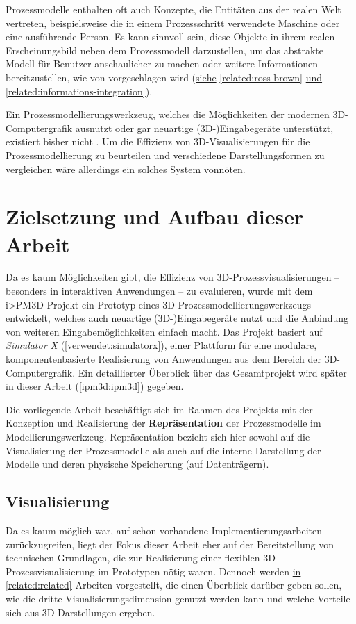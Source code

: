 \documentclass[a4paper,10pt]{sphinxmanual}
\begin{document}
Prozessmodelle enthalten oft auch Konzepte, die Entitäten aus der realen Welt vertreten, beispielsweise die in einem Prozessschritt verwendete Maschine oder eine ausführende Person.
Es kann sinnvoll sein, diese Objekte in ihrem realen Erscheinungsbild neben dem Prozessmodell darzustellen, um das abstrakte Modell für Benutzer anschaulicher zu machen oder weitere Informationen bereitzustellen, wie von \cite{brown_conceptual_2010} vorgeschlagen wird ({\hyperref[related:ross-brown]{siehe}} \autoref*{related:ross-brown} {\hyperref[related:informations-integration]{und}} \autoref*{related:informations-integration}).

Ein Prozessmodellierungswerkzeug, welches die Möglichkeiten der modernen 3D-Computergrafik ausnutzt oder gar neuartige (3D-)Eingabegeräte unterstützt, existiert bisher nicht \cite{brown_conceptual_2010}.
Um die Effizienz von 3D-Visualisierungen für die Prozessmodellierung zu beurteilen und verschiedene Darstellungsformen zu vergleichen wäre allerdings ein solches System vonnöten.


\section{Zielsetzung und Aufbau dieser Arbeit}
\label{einleitung:zielsetzung-und-aufbau-dieser-arbeit}
Da es kaum Möglichkeiten gibt, die Effizienz von 3D-Prozessvisualisierungen – besonders in interaktiven Anwendungen – zu evaluieren, wurde mit dem i\textgreater{}PM3D-Projekt ein Prototyp eines 3D-Prozessmodellierungswerkzeugs entwickelt, welches auch neuartige (3D-)Eingabegeräte nutzt und die Anbindung von weiteren Eingabemöglichkeiten einfach macht.
Das Projekt basiert auf {\hyperref[verwendet:simulatorx]{\emph{Simulator X}}} (\autoref*{verwendet:simulatorx}), einer Plattform für eine modulare, komponentenbasierte Realisierung von Anwendungen aus dem Bereich der 3D-Computergrafik.
Ein detaillierter Überblick über das Gesamtprojekt wird später in {\hyperref[ipm3d:ipm3d]{dieser Arbeit}} (\autoref*{ipm3d:ipm3d}) gegeben.

Die vorliegende Arbeit beschäftigt sich im Rahmen des Projekts mit der Konzeption und Realisierung der \textbf{Repräsentation} der Prozessmodelle im Modellierungswerkzeug.
Repräsentation bezieht sich hier sowohl auf die Visualisierung der Prozessmodelle als auch auf die interne Darstellung der Modelle und deren physische Speicherung (auf Datenträgern).


\subsection{Visualisierung}
\label{einleitung:visualisierung}
Da es kaum möglich war, auf schon vorhandene Implementierungsarbeiten zurückzugreifen, liegt der Fokus dieser Arbeit eher auf der Bereitstellung von technischen Grundlagen, die zur Realisierung einer flexiblen 3D-Prozessvisualisierung im Prototypen nötig waren.
Dennoch werden {\hyperref[related:related]{in}} \autoref*{related:related} Arbeiten vorgestellt, die einen Überblick darüber geben sollen, wie die dritte Visualisierungsdimension genutzt werden kann und welche Vorteile sich aus 3D-Darstellungen ergeben.
\end{document}
